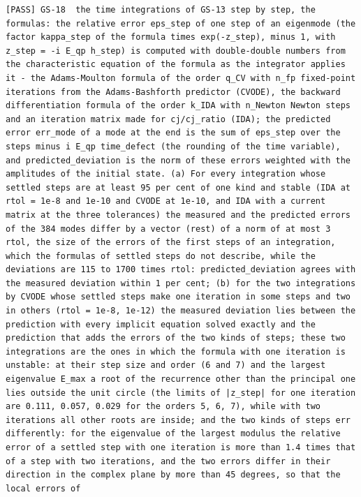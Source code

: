 \documentclass[
  10pt,
]{article}
\begin{document}
\begin{verbatim}
[PASS] GS-18  the time integrations of GS-13 step by step, the formulas: the relative error eps_step of one step of an eigenmode (the factor kappa_step of the formula times exp(-z_step), minus 1, with z_step = -i E_qp h_step) is computed with double-double numbers from the characteristic equation of the formula as the integrator applies it - the Adams-Moulton formula of the order q_CV with n_fp fixed-point iterations from the Adams-Bashforth predictor (CVODE), the backward differentiation formula of the order k_IDA with n_Newton Newton steps and an iteration matrix made for cj/cj_ratio (IDA); the predicted error err_mode of a mode at the end is the sum of eps_step over the steps minus i E_qp time_defect (the rounding of the time variable), and predicted_deviation is the norm of these errors weighted with the amplitudes of the initial state. (a) For every integration whose settled steps are at least 95 per cent of one kind and stable (IDA at rtol = 1e-8 and 1e-10 and CVODE at 1e-10, and IDA with a current matrix at the three tolerances) the measured and the predicted errors of the 384 modes differ by a vector (rest) of a norm of at most 3 rtol, the size of the errors of the first steps of an integration, which the formulas of settled steps do not describe, while the deviations are 115 to 1700 times rtol: predicted_deviation agrees with the measured deviation within 1 per cent; (b) for the two integrations by CVODE whose settled steps make one iteration in some steps and two in others (rtol = 1e-8, 1e-12) the measured deviation lies between the prediction with every implicit equation solved exactly and the prediction that adds the errors of the two kinds of steps; these two integrations are the ones in which the formula with one iteration is unstable: at their step size and order (6 and 7) and the largest eigenvalue E_max a root of the recurrence other than the principal one lies outside the unit circle (the limits of |z_step| for one iteration are 0.111, 0.057, 0.029 for the orders 5, 6, 7), while with two iterations all other roots are inside; and the two kinds of steps err differently: for the eigenvalue of the largest modulus the relative error of a settled step with one iteration is more than 1.4 times that of a step with two iterations, and the two errors differ in their direction in the complex plane by more than 45 degrees, so that the local errors of

\end{verbatim}
\end{document}

